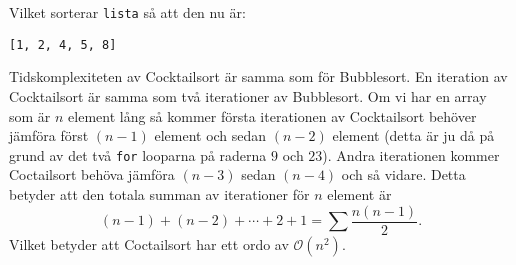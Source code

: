 \documentclass[a4, oneside]{report}
\begin{document}
Vilket sorterar \lstinline{lista} så att den nu är:
\begin{lstlisting}[style=mystyle, numbers=none]
 [1, 2, 4, 5, 8]
\end{lstlisting}
Tidskomplexiteten av Cocktailsort är samma som för Bubblesort. En iteration av Cocktailsort är samma som två iterationer av Bubblesort. Om vi har en array som är $n$ element lång så kommer första iterationen av Cocktailsort behöver jämföra först $(n-1)$ element och sedan $(n-2)$ element (detta är ju då på grund av det två \lstinline{for} looparna på raderna $9$ och $23$). Andra iterationen kommer Coctailsort behöva jämföra  $(n-3)$ sedan $(n-4)$ och så vidare. Detta betyder att den totala summan av iterationer för $n$ element är 
\begin{equation*}
  (n-1) + (n-2) + \cdots + 2 + 1 = \sum\frac{n(n-1)}{2}.
\end{equation*}
Vilket betyder att Coctailsort har ett ordo av $\mathcal{O}(n^2)$.\\
\end{document}

